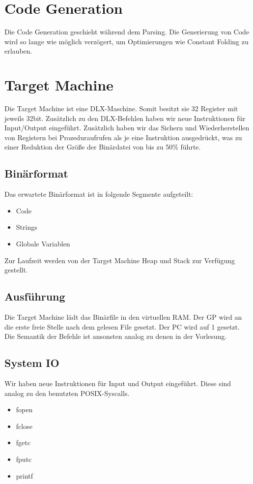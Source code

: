 \documentclass[a4paper]{article}
\begin{document}
	\section{Code Generation}
	Die Code Generation geschieht während dem Parsing.
	Die Generierung von Code wird so lange wie möglich verzögert, um Optimierungen wie Constant Folding zu erlauben.

	\section{Target Machine}
	Die Target Machine ist eine DLX-Maschine.
	Somit besitzt sie 32 Register mit jeweils 32bit.
	Zusätzlich zu den DLX-Befehlen haben wir neue Instruktionen für Input/Output eingeführt.
	Zusätzlich haben wir das Sichern und Wiederherstellen von Registern bei Prozeduraufrufen als je eine Instruktion ausgedrückt,
	was zu einer Reduktion der Größe der Binärdatei von bis zu 50\% führte.

	\subsection{Binärformat}
	Das erwartete Binärformat ist in folgende Segmente aufgeteilt:
	\begin{itemize}
		\item Code
		\item Strings
		\item Globale Variablen
	\end{itemize}

	Zur Laufzeit werden von der Target Machine Heap und Stack zur Verfügung gestellt.

	\subsection{Ausführung}
	Die Target Machine lädt das Binärfile in den virtuellen RAM.
	Der GP wird an die erste freie Stelle nach dem gelesen File gesetzt.
	Der PC wird auf 1 gesetzt.
	Die Semantik der Befehle ist ansonsten analog zu denen in der Vorlesung.

	\subsection{System IO}
	Wir haben neue Instruktionen für Input und Output eingeführt.
	Diese sind analog zu den benutzten POSIX-Syscalls.
	\begin{itemize}
		\item fopen
		\item fclose
		\item fgetc
		\item fputc
		\item printf
	\end{itemize}
\end{document}
